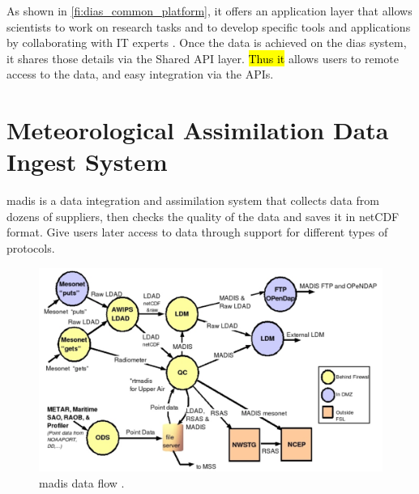 As shown in \cref{fi:dias_common_platform}, it offers an application layer that allows scientists %
to work on research tasks and to develop specific tools and applications by collaborating with IT experts \cite{Kawasaki2018DataReduction}. Once the data is achieved on the \acrshort{dias} system, it shares those details via the Shared API layer. \hl{Thus it} allows users to remote access to the data, and easy integration via the APIs.



\section{Meteorological Assimilation Data Ingest System}
\label{se:madis}
\acrfull{madis} \cite{Macdermaid2005ArchitectureP2.39} is a data integration and assimilation system that collects data from dozens of suppliers, then checks the quality of the data and saves it in \acrshort{netCDF} format. Give users later access to data through support for different types of protocols.

\begin{figure}[htp]
    \centering
    \includegraphics[width=1\textwidth]{lit/other/madis_flow.png}
    \caption[\acrshort{madis} data flow]{\acrshort{madis} data flow \cite{Macdermaid2005ArchitectureP2.39}.}
    \label{fi:madis_flow}
\end{figure}


